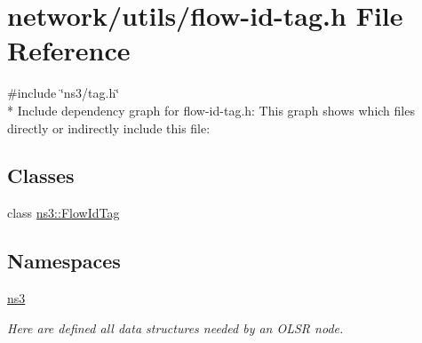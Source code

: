 \hypertarget{flow-id-tag_8h}{}\section{network/utils/flow-\/id-\/tag.h File Reference}
\label{flow-id-tag_8h}
{\ttfamily \#include \char`\"{}ns3/tag.\+h\char`\"{}}\\*
Include dependency graph for flow-\/id-\/tag.h\+:
This graph shows which files directly or indirectly include this file\+:
\subsection*{Classes}
\begin{DoxyCompactItemize}
\item 
class \hyperlink{classns3_1_1FlowIdTag}{ns3\+::\+Flow\+Id\+Tag}
\end{DoxyCompactItemize}
\subsection*{Namespaces}
\begin{DoxyCompactItemize}
\item 
 \hyperlink{namespacens3}{ns3}
\begin{DoxyCompactList}\small\item\em Here are defined all data structures needed by an O\+L\+SR node. \end{DoxyCompactList}\end{DoxyCompactItemize}
